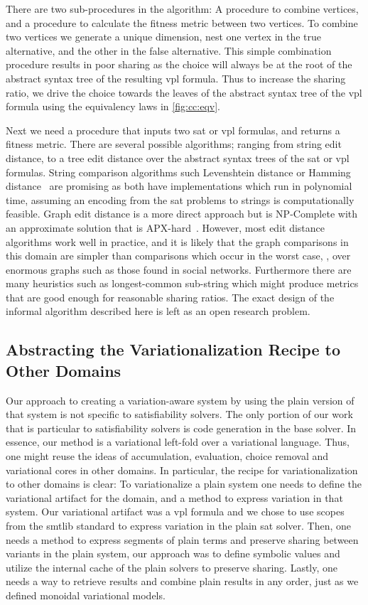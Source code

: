 There are two sub-procedures in the algorithm: A procedure to combine vertices,
and a procedure to calculate the fitness metric between two vertices. To combine
two vertices we generate a unique dimension, nest one vertex in the true
alternative, and the other in the false alternative. This simple combination
procedure results in poor sharing as the choice will always be at the root of
the abstract syntax tree of the resulting \ac{vpl} formula. Thus to increase the
sharing ratio, we drive the choice towards the leaves of the abstract syntax
tree of the \ac{vpl} formula using the equivalency laws in \autoref{fig:cc:eqv}.

Next we need a procedure that inputs two \ac{sat} or \ac{vpl} formulas, and
returns a fitness metric. There are several possible algorithms; ranging from
string edit distance, to a tree edit distance over the abstract syntax trees of
the \ac{sat} or \ac{vpl} formulas. String comparison algorithms such Levenshtein
distance\cite{Levenshtein_SPD66} or Hamming distance~\cite{H:BST50} are
promising as both have implementations which run in polynomial time, assuming an
encoding from the \ac{sat} problems to strings is computationally feasible.
Graph edit distance is a more direct approach but is NP-Complete with an
approximate solution that is APX-hard~\cite{hardnessOfGraphEditDistance}.
However, most edit distance algorithms work well in practice, and it is likely
that the graph comparisons in this domain are simpler than comparisons which
occur in the worst case, \eg{}, over enormous graphs such as those found in
social networks. Furthermore there are many heuristics such as longest-common
sub-string which might produce metrics that are good enough for reasonable
sharing ratios. The exact design of the informal algorithm described here is
left as an open research problem.

\subsection{Abstracting the Variationalization Recipe to Other Domains}
Our approach to creating a variation-aware system by using the plain version of
that system is not specific to satisfiability solvers. The only portion of our
work that is particular to satisfiability solvers is code generation in the base
solver. In essence, our method is a variational left-fold over a variational
language. Thus, one might reuse the ideas of accumulation, evaluation, choice
removal and variational cores in other domains. In particular, the recipe for
variationalization to other domains is clear: To variationalize a plain system
one needs to define the variational artifact for the domain, and a method to
express variation in that system. Our variational artifact was a \ac{vpl}
formula and we chose to use scopes from the \acl{smtlib} standard to express
variation in the plain \ac{sat} solver. Then, one needs a method to express
segments of plain terms and preserve sharing between variants in the plain
system, our approach was to define symbolic values and utilize the internal
cache of the plain solvers to preserve sharing. Lastly, one needs a way to
retrieve results and combine plain results in any order, just as we defined
monoidal variational models.

